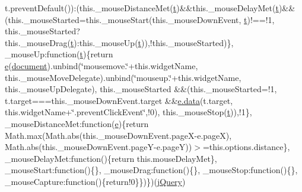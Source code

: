 \begin{DoxyCompactItemize}
t.\-prevent\-Default())\-:(this.\-\_\-mouse\-Distance\-Met(\hyperlink{static_2root_2js_2bootstrap_2jquery-ui-1_810_84_8custom_8min_8js_acf335ef347969ef6dc8387e680fb289e}{t})\&\&this.\-\_\-mouse\-Delay\-Met(\hyperlink{static_2root_2js_2bootstrap_2jquery-ui-1_810_84_8custom_8min_8js_acf335ef347969ef6dc8387e680fb289e}{t})\&\&(this.\-\_\-mouse\-Started=this.\-\_\-mouse\-Start(this.\-\_\-mouse\-Down\-Event, \hyperlink{static_2root_2js_2bootstrap_2jquery-ui-1_810_84_8custom_8min_8js_acf335ef347969ef6dc8387e680fb289e}{t})!==!1, this.\-\_\-mouse\-Started?this.\-\_\-mouse\-Drag(\hyperlink{static_2root_2js_2bootstrap_2jquery-ui-1_810_84_8custom_8min_8js_acf335ef347969ef6dc8387e680fb289e}{t})\-:this.\-\_\-mouse\-Up(\hyperlink{static_2root_2js_2bootstrap_2jquery-ui-1_810_84_8custom_8min_8js_acf335ef347969ef6dc8387e680fb289e}{t})),!this.\-\_\-mouse\-Started)\}, \-\_\-mouse\-Up\-:function(\hyperlink{static_2root_2js_2bootstrap_2jquery-ui-1_810_84_8custom_8min_8js_acf335ef347969ef6dc8387e680fb289e}{t})\{return \hyperlink{static_2root_2js_2jquery-ui_8custom_8min_8js_abea95a4e94bc6f4151d5683d4c12c3f4}{e}(\hyperlink{static_2root_2js_2headroom_8min_8js_aa14f8e0338cced6720590fd2ea13bd4b}{document}).unbind(\char`\"{}mousemove.\char`\"{}+this.\-widget\-Name, this.\-\_\-mouse\-Move\-Delegate).unbind(\char`\"{}mouseup.\char`\"{}+this.\-widget\-Name, this.\-\_\-mouse\-Up\-Delegate), this.\-\_\-mouse\-Started \&\&(this.\-\_\-mouse\-Started=!1, t.\-target===this.\-\_\-mouse\-Down\-Event.\-target \&\&\hyperlink{jquery-migrate-1_82_81_8min_8js_a7f60fda3d1d4191e549df075eeacf25b}{e.\-data}(t.\-target, this.\-widget\-Name+\char`\"{}.prevent\-Click\-Event\char`\"{},!0), this.\-\_\-mouse\-Stop(\hyperlink{static_2root_2js_2bootstrap_2jquery-ui-1_810_84_8custom_8min_8js_acf335ef347969ef6dc8387e680fb289e}{t})),!1\}, \-\_\-mouse\-Distance\-Met\-:function(\hyperlink{static_2root_2js_2jquery-ui_8custom_8min_8js_abea95a4e94bc6f4151d5683d4c12c3f4}{e})\{return Math.\-max(Math.\-abs(this.\-\_\-mouse\-Down\-Event.\-page\-X-\/e.\-page\-X), Math.\-abs(this.\-\_\-mouse\-Down\-Event.\-page\-Y-\/e.\-page\-Y))$>$=this.\-options.\-distance\}, \-\_\-mouse\-Delay\-Met\-:function()\{return this.\-mouse\-Delay\-Met\}, \-\_\-mouse\-Start\-:function()\{\}, \-\_\-mouse\-Drag\-:function()\{\}, \-\_\-mouse\-Stop\-:function()\{\}, \-\_\-mouse\-Capture\-:function()\{return!0\}\})\})(\hyperlink{jquery_8js_a5e01048fbd3a30b44e8d491d8945c457}{j\-Query})
\end{DoxyCompactItemize}
